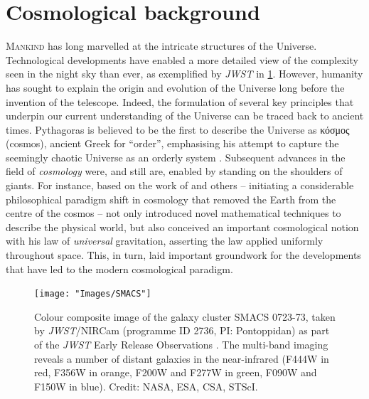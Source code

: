     \fancyhf{}
    \fancyfoot[C]{\color{white}\thepage}
    \newpage
    \setFancyHdr
\fi



\section{Cosmological background}

\lettrine{M}{ankind} has long marvelled at the intricate structures of the Universe. Technological developments have enabled a more detailed view of the complexity seen in the night sky than ever, as exemplified by \textit{JWST} in \cref{chIfig:SMACS}. However, humanity has sought to explain the origin and evolution of the Universe long before the invention of the telescope. Indeed, the formulation of several key principles that underpin our current understanding of the Universe can be traced back to ancient times. Pythagoras is believed to be the first to describe the Universe as \textgreek{κόσμος} (cosmos), ancient Greek for ``order'', emphasising his attempt to capture the seemingly chaotic Universe as an orderly system \citep[e.g.][]{1860Humboldt}. Subsequent advances in the field of \textit{cosmology} were, and still are, enabled by standing on the shoulders of giants. For instance, based on the work of \citet{Copernicus1543} and others -- initiating a considerable philosophical paradigm shift in cosmology that removed the Earth from the centre of the cosmos -- \citet{Newton1687} not only introduced novel mathematical techniques to describe the physical world, but also conceived an important cosmological notion with his law of \textit{universal} gravitation, asserting the law applied uniformly throughout space. This, in turn, laid important groundwork for the developments that have led to the modern cosmological paradigm.
\begin{figure}
    \centering
    \texttt{[image: "Images/SMACS"]}
    \caption[Colour composite image of the galaxy cluster SMACS 0723-73.]{Colour composite image of the galaxy cluster SMACS 0723-73, taken by \textit{JWST}/NIRCam (programme ID 2736, PI: Pontoppidan) as part of the \textit{JWST} Early Release Observations \citep[EROs;][]{2022arXiv220713067P}. The multi-band imaging reveals a number of distant galaxies in the near-infrared (F444W in red, F356W in orange, F200W and F277W in green, F090W and F150W in blue). Credit: NASA, ESA, CSA, STScI.}
    \label{chIfig:SMACS}
\end{figure}

